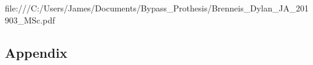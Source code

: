 \documentclass[letterpaper,12pt]{article}
\begin{document}
\begin{thebibliography}{99}
file:///C:/Users/James/Documents/Bypass_Prothesis/Brenneis_Dylan_JA_201903_MSc.pdf
%
%
%
%
%
%
%
%
%
%
%
%
%
%

\end{thebibliography}

\begin{appendices}
\section{Appendix}
\end{appendices}
\end{document}
